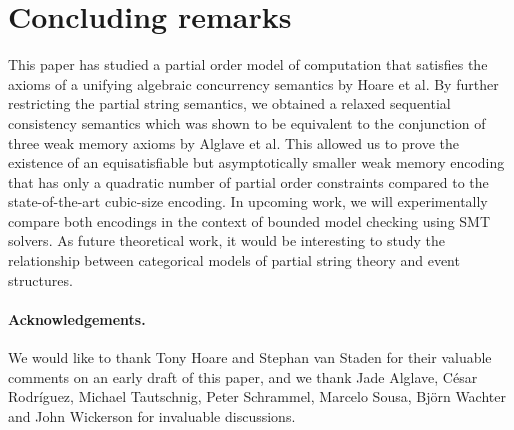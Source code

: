 \documentclass{llncs}
\begin{document}
\section{Concluding remarks}
\vspace{-0.3em}
\label{section:concl}

This paper has studied a partial order model of computation that satisfies the axioms of a unifying algebraic concurrency semantics by Hoare et al. By further restricting the partial string semantics, we obtained a relaxed sequential consistency semantics which was shown to be equivalent to the conjunction of three weak memory axioms by Alglave et al. This allowed us to prove the existence of an equisatisfiable but asymptotically smaller weak memory encoding that has only a quadratic number of partial order constraints compared to the state-of-the-art cubic-size encoding. In upcoming work, we will experimentally compare both encodings in the context of bounded model checking using SMT solvers. As future theoretical work, it would be interesting to study the relationship between categorical models of partial string theory and event structures.

\paragraph{Acknowledgements.} We would like to thank Tony Hoare and Stephan van Staden for their valuable comments on an early draft of this paper, and we thank Jade Alglave, C\'{e}sar Rodr\'{i}guez, Michael Tautschnig, Peter Schrammel, Marcelo Sousa, Bj\"{o}rn Wachter and John Wickerson for invaluable discussions.



\end{document}
